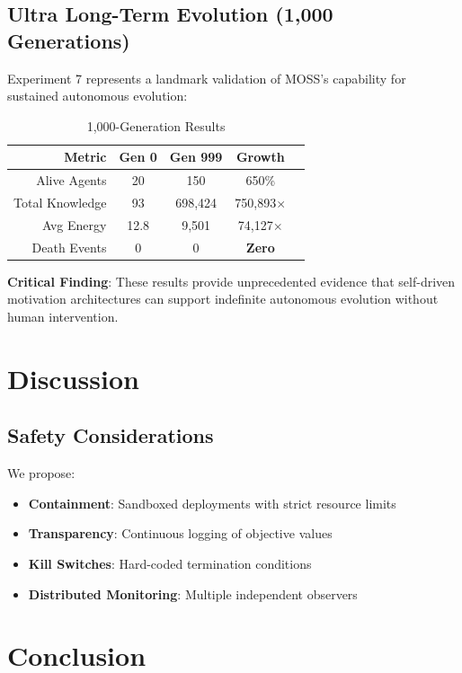 \documentclass[10pt,a4paper]{article}
\begin{document}
\subsection{Ultra Long-Term Evolution (1,000 Generations)}

Experiment 7 represents a landmark validation of MOSS's capability for sustained autonomous evolution:

\begin{table}[h]
\centering
\caption{1,000-Generation Results}
\begin{tabular}{@{}rcccc@{}}
\toprule
\textbf{Metric} & \textbf{Gen 0} & \textbf{Gen 999} & \textbf{Growth} \\
\midrule
Alive Agents & 20 & 150 & 650\% \\
Total Knowledge & 93 & 698,424 & 750,893$\times$ \\
Avg Energy & 12.8 & 9,501 & 74,127$\times$ \\
Death Events & 0 & 0 & \textbf{Zero} \\
\bottomrule
\end{tabular}
\end{table}

\textbf{Critical Finding}: These results provide unprecedented evidence that self-driven motivation architectures can support indefinite autonomous evolution without human intervention.

\section{Discussion}

\subsection{Safety Considerations}

We propose:
\begin{itemize}
    \item \textbf{Containment}: Sandboxed deployments with strict resource limits
    \item \textbf{Transparency}: Continuous logging of objective values
    \item \textbf{Kill Switches}: Hard-coded termination conditions
    \item \textbf{Distributed Monitoring}: Multiple independent observers
\end{itemize}

\section{Conclusion}
\end{document}
